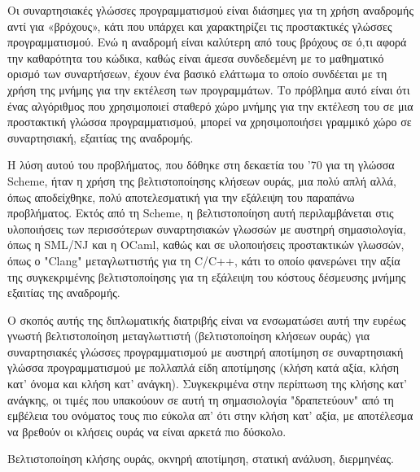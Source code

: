 \documentclass[diploma]{softlab-thesis}
\begin{document}
\begin{abstractgr}%

Οι συναρτησιακές γλώσσες προγραμματισμού είναι διάσημες για τη χρήση αναδρομής αντί για «βρόχους», 
κάτι που υπάρχει και χαρακτηρίζει τις προστακτικές γλώσσες προγραμματισμού. Ενώ η αναδρομή είναι καλύτερη από 
τους βρόχους σε ό,τι αφορά την καθαρότητα του κώδικα, καθώς είναι άμεσα συνδεδεμένη με το μαθηματικό ορισμό
των συναρτήσεων, έχουν ένα βασικό ελάττωμα το οποίο συνδέεται με τη χρήση της μνήμης για την εκτέλεση των 
προγραμμάτων. Το πρόβλημα αυτό είναι ότι ένας αλγόριθμος που χρησιμοποιεί σταθερό χώρο μνήμης για την εκτέλεση του
σε μια προστακτική γλώσσα προγραμματισμού, μπορεί να χρησιμοποιήσει γραμμικό χώρο σε συναρτησιακή, εξαιτίας 
της αναδρομής.
  

Η λύση αυτού του προβλήματος, που δόθηκε στη δεκαετία του '70 για τη γλώσσα Scheme, ήταν η χρήση της βελτιστοποίησης
κλήσεων ουράς, μια πολύ απλή αλλά, όπως αποδείχθηκε, πολύ αποτελεσματική για την εξάλειψη του παραπάνω προβλήματος.
Εκτός από τη Scheme, η βελτιστοποίηση αυτή περιλαμβάνεται στις υλοποιήσεις των περισσότερων συναρτησιακών 
γλωσσών με αυστηρή σημασιολογία, όπως η SML/NJ και η OCaml, καθώς και σε υλοποιήσεις προστακτικών 
γλωσσών, όπως ο "Clang" μεταγλωττιστής για τη C/C++, κάτι το οποίο φανερώνει την αξία της συγκεκριμένης 
βελτιστοποίησης για τη εξάλειψη του κόστους δέσμευσης μνήμης εξαιτίας της αναδρομής. 

Ο σκοπός αυτής της διπλωματικής διατριβής είναι να ενσωματώσει αυτή την ευρέως γνωστή βελτιστοποίηση 
μεταγλωττιστή (βελτιστοποίηση κλήσεων ουράς) για συναρτησιακές γλώσσες προγραμματισμού με αυστηρή αποτίμηση σε 
συναρτησιακή γλώσσα προγραμματισμού με πολλαπλά είδη αποτίμησης (κλήση κατά αξία, κλήση κατ' όνομα και 
κλήση κατ' ανάγκη). Συγκεκριμένα στην  περίπτωση της κλήσης κατ' ανάγκης, οι τιμές που υπακούουν σε αυτή τη
σημασιολογία "δραπετεύουν" από τη εμβέλεια του ονόματος τους πιο εύκολα απ' ότι στην 
κλήση κατ' αξία, με αποτέλεσμα να βρεθούν οι κλήσεις ουράς να είναι αρκετά πιο δύσκολο.


\begin{keywordsgr}
Βελτιστοποίηση κλήσης ουράς, οκνηρή αποτίμηση, στατική ανάλυση, διερμηνέας.
\end{keywordsgr}
\end{abstractgr}



\end{document}
